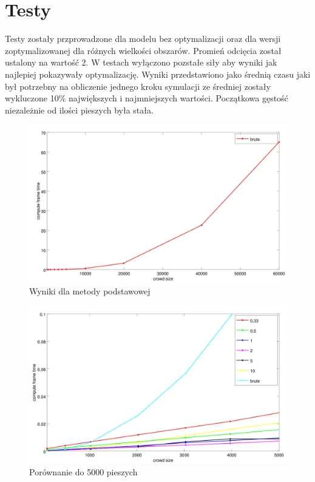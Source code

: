 \documentclass{article}
\begin{document}
\section{Testy}
Testy zostały przprowadzone dla modelu bez optymalizacji oraz dla wersji zoptymalizowanej dla różnych wielkości obszarów. Promień odcięcia został ustalony na wartość 2. W testach wyłączono pozstałe siły aby wyniki jak najlepiej pokazywały optymalizację. Wyniki przedstawiono jako średnią czasu jaki był potrzebny na obliczenie jednego kroku symulacji ze średniej zostały wykluczone 10\% największych i najmniejszych wartości. Początkowa gęstość niezależnie od ilości pieszych była stała.

\begin{figure}
    \centering
    \includegraphics[width=5.5in]{onlyBrute.png}
    \caption{Wyniki dla metody podstawowej}
    \label{rys:result1}
\end{figure}

\begin{figure}
    \centering
    \includegraphics[width=5.5in]{both5000.png}
    \caption{Porównanie do 5000 pieszych}
    \label{rys:result2}
\end{figure}
\end{document}
